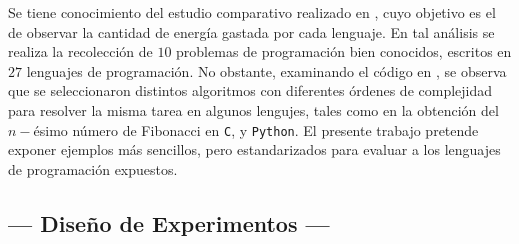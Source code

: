\documentclass[11pt,a4paper]{article}
\begin{document}
Se tiene conocimiento del estudio comparativo realizado en , cuyo objetivo es el de observar la cantidad de energía gastada por cada lenguaje.
En tal análisis se realiza la recolección de \(10\) problemas de programación bien conocidos, escritos en \(27\) lenguajes de programación.
No obstante, examinando el código en , se observa que se seleccionaron distintos algoritmos con diferentes órdenes de complejidad para resolver la misma tarea en algunos lengujes, tales como en la obtención del \(n-\)ésimo número de Fibonacci en \texttt{C}, y \texttt{Python}.
El presente trabajo pretende exponer ejemplos más sencillos, pero estandarizados para evaluar a los lenguajes de programación expuestos.

\subsection{--- Diseño de Experimentos ---} %
\label{sub:diseño}
\end{document}

